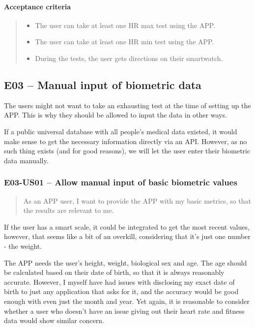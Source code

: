 \paragraph*{Acceptance criteria}
\begin{quote}
\begin{itemize}
    \item The user can take at least one HR max test using the APP.
    \item The user can take at least one HR min test using the APP.
    \item During the tests, the user gets directions on their smartwatch.
\end{itemize}
\end{quote}


\subsection*{E03 -- Manual input of biometric data}

The users might not want to take an exhausting test at the time of setting up the APP.
This is why they should be allowed to input the data in other ways.

If a public universal database with all people's medical data existed, it would make sense to get the necessary information directly via an API.
However, as no such thing exists (and for good reasons), we will let the user enter their biometric data manually.

\subsubsection*{E03-US01 -- Allow manual input of basic biometric values}
\begin{quote}
As an APP user, I want to provide the APP with my basic metrics, so that the results are relevant to me.
\end{quote}

If the user has a smart scale, it could be integrated to get the most recent values, however, that seems like a bit of an overkill, considering that it's just one number - the weight.

The APP needs the user's height, weight, biological sex and age.
The age should be calculated based on their date of birth, so that it is always reasonably accurate.
However, I myself have had issues with disclosing my exact date of birth to just any application that asks for it, and the accuracy would be good enough with even just the month and year.
Yet again, it is reasonable to consider whether a user who doesn't have an issue giving out their heart rate and fitness data would show similar concern.

